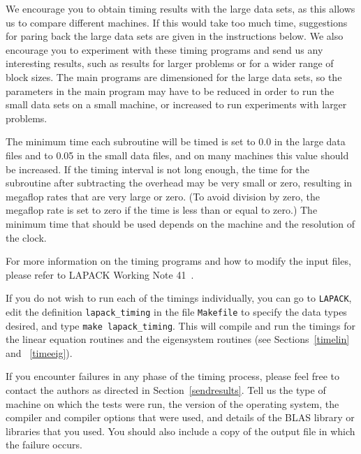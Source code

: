 \documentclass[11pt]{report}
\begin{document}
We encourage you to obtain timing results with the large data sets,
as this allows us to compare different machines.
If this would take too much time, suggestions for paring back the large
data sets are given in the instructions below.
We also encourage you to experiment with these timing
programs and send us any interesting results, such as results for
larger problems or for a wider range of block sizes.
The main programs are dimensioned for the large data sets,
so the parameters in the main program may have to be reduced in order
to run the small data sets on a small machine, or increased to run
experiments with larger problems.

The minimum time each subroutine will be timed is set to 0.0 in
the large data files and to 0.05 in the small data files, and on
many machines this value should be increased.
If the timing interval is not long
enough, the time for the subroutine after subtracting the overhead
may be very small or zero, resulting in megaflop rates that are
very large or zero. (To avoid division by zero, the megaflop rate is
set to zero if the time is less than or equal to zero.)
The minimum time that should be used depends on the machine and the
resolution of the clock.

For more information on the timing programs and how to modify the
input files, please refer to LAPACK Working Note 41~\cite{WN41}.

If you do not wish to run each of the timings individually, you can
go to \texttt{LAPACK}, edit the definition \texttt{lapack\_timing} in the file
\texttt{Makefile} to specify the data types desired, and type \texttt{make
lapack\_timing}.  This will compile
and run the timings for the linear equation routines and the eigensystem
routines (see Sections~\ref{timelin} and ~\ref{timeeig}).


If you encounter failures in any phase of the timing process, please
feel free to contact the authors as directed in Section~\ref{sendresults}.
Tell us the
type of machine on which the tests were run, the version of the operating
system, the compiler and compiler options that were used,
and details of the BLAS library or libraries that you used.  You should
also include a copy of the output file in which the failure occurs.
\end{document}
